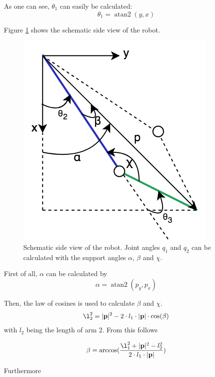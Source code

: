 \documentclass[conference]{IEEEtran}
\DeclareMathOperator{\atantwo}{atan2}
\begin{document}
As one can see, $\theta_1$ can easily be calculated:
\begin{equation}
\theta_1 = \atantwo(y,x)
\end{equation}

Figure \ref{fig:q1_q2_calc} shows the schematic side view of the robot.

\begin{figure}[htbp]
	\centerline{\includegraphics[scale=0.4]{img/kin_q1_q2.png}}
	\caption{Schematic side view of the robot. Joint angles $q_1$ and $q_2$ can be calculated with the support angles $\alpha$, $\beta$ and $\chi$.}
	\label{fig:q1_q2_calc}
\end{figure}

First of all, $\alpha$ can be calculated by
\begin{equation}
\alpha = \atantwo(p_y, p_x)
\end{equation}

Then, the law of cosines is used to calculate $\beta$ and $\chi$.
\begin{equation}
\l_2^2 = |\textbf{p}|^2 - 2 \cdot l_1 \cdot |\textbf{p}| \cdot \cos(\beta)
\end{equation}
with $l_2$ being the length of arm 2. From this follows

\begin{equation}
\beta = \arccos(\frac{\l_1^2 + |\textbf{p}|^2 - l_2^2}{2 \cdot l_1 \cdot |\textbf{p}|})
\end{equation}

Furthermore
\end{document}
